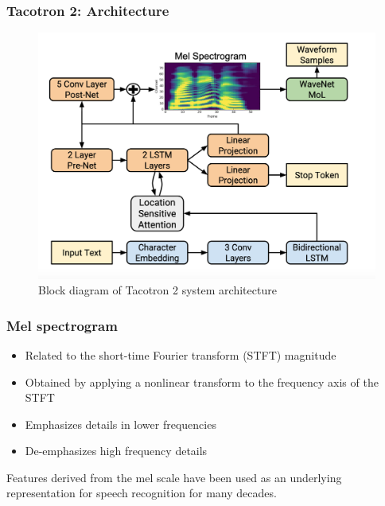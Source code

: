 \documentclass{beamer}
\begin{document}
  \begin{frame}
    \frametitle{Tacotron 2: Architecture}
    \begin{figure}
      \includegraphics[scale=0.25]{images/tacotron_arch.png}
      \caption{Block diagram of Tacotron 2 system architecture}
    \end{figure}
  \end{frame}

  \begin{frame}
    \frametitle{Mel spectrogram}
      \begin{itemize}
        \item Related to the short-time Fourier transform (STFT) magnitude 
        \item Obtained by applying a nonlinear transform to the frequency axis of the STFT
        \item Emphasizes details in lower frequencies
        \item De-emphasizes high frequency details
      \end{itemize}
      Features derived from the mel scale have been used as an underlying representation for speech recognition for many decades. 
  \end{frame}
\end{document}
